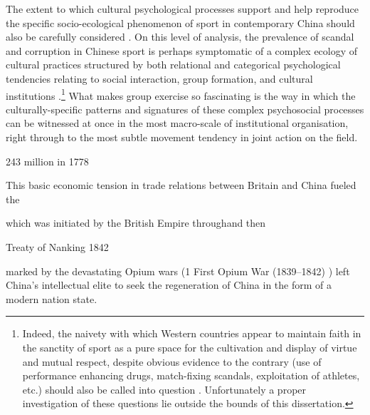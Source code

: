 The extent to which cultural psychological processes support and help reproduce the specific socio-ecological phenomenon of sport in contemporary China should also be carefully considered \citep{Sperber1996,Nisbett2003}.  On this level of analysis, the prevalence of scandal and corruption in Chinese sport is perhaps symptomatic of a complex ecology of cultural practices structured by both relational and categorical psychological tendencies relating to social interaction, group formation, and cultural institutions \citep{Nisbett2003,Yuki2005,Liu2009}.\footnote{Indeed, the naivety with which Western countries appear to maintain faith in the sanctity of sport as a pure space for the cultivation and display of virtue and mutual respect, despite obvious evidence to the contrary (use of performance enhancing drugs, match-fixing scandals, exploitation of athletes, etc.) should also be called into question \citep{Southall2017}.  Unfortunately a proper investigation of these questions lie outside the bounds of this dissertation.} What makes group exercise so fascinating is the way in which the culturally-specific patterns and signatures of these complex psychosocial processes can be witnessed at once in the most macro-scale of institutional organisation, right through to the most subtle movement tendency in joint action on the field.









243 million in 1778

This basic economic tension in trade relations between Britain and China fueled the

 which was initiated by the British Empire throughand then

Treaty of Nanking 1842

marked by the devastating Opium wars (1 First Opium War (1839–1842) ) left China's intellectual elite to seek the regeneration of China in the form of a modern nation state.









